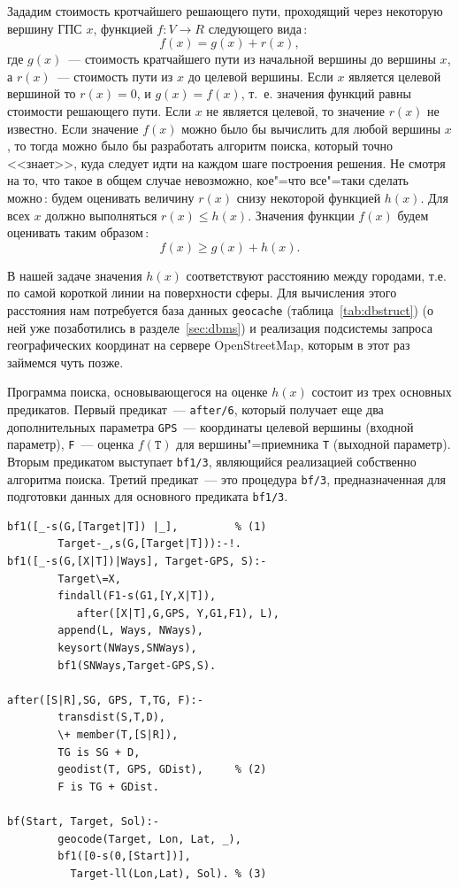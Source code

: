 \documentclass[a4paper,14pt, openany, twoside, draft]{extbook} %
\begin{document}
Зададим стоимость кротчайшего решающего пути, проходящий через некоторую вершину ГПС $x$, функцией $f:V\to R$ следующего вида\,:
\begin{equation}
  \label{eq:1}
  f(x)=g(x)+r(x),
\end{equation}
где $g(x)$~--- стоимость кратчайшего пути из начальной вершины до вершины $x$, а $r(x)$~--- стоимость пути из $x$ до целевой вершины.  Если $x$ является целевой вершиной то $r(x)=0$, и $g(x)=f(x)$, т.~е. значения функций равны стоимости решающего пути.  Если $x$ не является целевой, то значение $r(x)$ не известно.  Если значение $f(x)$ можно было бы вычислить для любой вершины $x$, то тогда можно было бы разработать алгоритм поиска, который точно <<знает>>, куда следует идти на каждом шаге построения решения.  Не смотря на то, что такое в общем случае невозможно, кое"=что все"=таки сделать можно\,: будем оценивать величину $r(x)$ снизу некоторой функцией $h(x)$.  Для всех $x$ должно выполняться $r(x)\leqslant h(x)$.  Значения функции $f(x)$ будем оценивать таким образом\,:
\begin{equation}
  \label{eq:2}
  f(x)\geqslant g(x)+h(x).
\end{equation}

В нашей задаче значения $h(x)$ соответствуют расстоянию между городами, т.е. по самой короткой линии на поверхности сферы.  Для вычисления этого расстояния нам потребуется база данных \texttt{geocache} (таблица~\ref{tab:dbstruct}) (о ней уже позаботились в разделе~\ref{sec:dbms}) и реализация подсистемы запроса географических координат на сервере \foreignlanguage{english}{OpenStreetMap}, которым в этот раз займемся чуть позже.

Программа поиска, основывающегося на оценке $h(x)$ состоит из трех основных предикатов.  Первый предикат~--- \texttt{after/6}, который получает еще два дополнительных параметра \texttt{GPS}~--- координаты целевой вершины (входной параметр), \texttt{F}~--- оценка $f(\mathtt{T})$ для вершины"=приемника \texttt{T} (выходной параметр).  Вторым предикатом выступает \texttt{bf1/3}, являющийся реализацией собственно алгоритма поиска.  Третий предикат~--- это процедура \texttt{bf/3}, предназначенная для подготовки данных для основного предиката \texttt{bf1/3}.

\begin{verbatim}
bf1([_-s(G,[Target|T]) |_],         % (1)
        Target-_,s(G,[Target|T])):-!.
bf1([_-s(G,[X|T])|Ways], Target-GPS, S):-
        Target\=X,
        findall(F1-s(G1,[Y,X|T]),
           after([X|T],G,GPS, Y,G1,F1), L),
        append(L, Ways, NWays),
        keysort(NWays,SNWays),
        bf1(SNWays,Target-GPS,S).

after([S|R],SG, GPS, T,TG, F):-
        transdist(S,T,D),
        \+ member(T,[S|R]),
        TG is SG + D,
        geodist(T, GPS, GDist),     % (2)
        F is TG + GDist.

bf(Start, Target, Sol):-
        geocode(Target, Lon, Lat, _),
        bf1([0-s(0,[Start])],
          Target-ll(Lon,Lat), Sol). % (3)
\end{verbatim}
\end{document}
